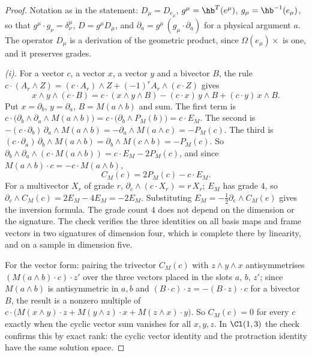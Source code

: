 \begin{proof}
Notation as in the statement: $D_{\mu} = D_{e_{\mu}}$, $g^{\mu} = \hb^{T}(e^{\mu})$, $g_{\mu} = \hb^{-1}(e_{\mu})$, so that $g^{\mu}\cdot g_{\nu} = \delta^{\mu}_{\nu}$, $D = g^{\mu}D_{\mu}$, and $\partial_{a} = g^{\mu}\,(g_{\mu}\cdot\partial_{a})$ for a physical argument $a$. The operator $D_{\mu}$ is a derivation of the geometric product, since $\Omega(e_{\mu})\times$ is one, and it preserves grades.

\emph{(i).} For a vector $c$, a vector $x$, a vector $y$ and a bivector $B$, the rule $c\cdot(A_{r}\wedge Z) = (c\cdot A_{r})\wedge Z + (-1)^{r}A_{r}\wedge(c\cdot Z)$ gives
\[
x\wedge y\wedge(c\cdot B) = c\cdot(x\wedge y\wedge B) - (c\cdot x)\,y\wedge B + (c\cdot y)\,x\wedge B .
\]
Put $x = \partial_{b}$, $y = \partial_{a}$, $B = M(a\wedge b)$ and sum. The first term is $c\cdot\bigl(\partial_{b}\wedge\partial_{a}\wedge M(a\wedge b)\bigr) = c\cdot\bigl(\partial_{b}\wedge P_{M}(b)\bigr) = c\cdot E_{M}$. The second is $-(c\cdot\partial_{b})\,\partial_{a}\wedge M(a\wedge b) = -\partial_{a}\wedge M(a\wedge c) = -P_{M}(c)$. The third is $(c\cdot\partial_{a})\,\partial_{b}\wedge M(a\wedge b) = \partial_{b}\wedge M(c\wedge b) = -P_{M}(c)$. So $\partial_{b}\wedge\partial_{a}\wedge(c\cdot M(a\wedge b)) = c\cdot E_{M} - 2P_{M}(c)$, and since $M(a\wedge b)\cdot c = -c\cdot M(a\wedge b)$,
\[
C_{M}(c) = 2P_{M}(c) - c\cdot E_{M} .
\]
For a multivector $X_{r}$ of grade $r$, $\partial_{c}\wedge(c\cdot X_{r}) = r\,X_{r}$; $E_{M}$ has grade $4$, so $\partial_{c}\wedge C_{M}(c) = 2E_{M} - 4E_{M} = -2E_{M}$. Substituting $E_{M} = -\tfrac12\partial_{e}\wedge C_{M}(e)$ gives the inversion formula. The grade count $4$ does not depend on the dimension or the signature. The check verifies the three identities on all basis maps and frame vectors in two signatures of dimension four, which is complete there by linearity, and on a sample in dimension five.

For the vector form: pairing the trivector $C_{M}(c)$ with $z\wedge y\wedge x$ antisymmetrises $(M(a\wedge b)\cdot c)\cdot z'$ over the three vectors placed in the slots $a$, $b$, $z'$; since $M(a\wedge b)$ is antisymmetric in $a, b$ and $(B\cdot c)\cdot z = -(B\cdot z)\cdot c$ for a bivector $B$, the result is a nonzero multiple of $c\cdot\bigl(M(x\wedge y)\cdot z + M(y\wedge z)\cdot x + M(z\wedge x)\cdot y\bigr)$. So $C_{M}(c) = 0$ for every $c$ exactly when the cyclic vector sum vanishes for all $x, y, z$. In $\Cl(1,3)$ the check confirms this by exact rank: the cyclic vector identity and the protraction identity have the same solution space.


\end{proof}
